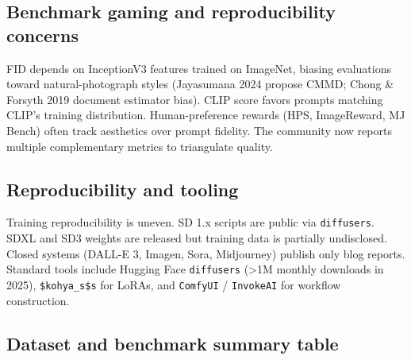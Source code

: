 \subsection{Benchmark gaming and reproducibility concerns}\label{benchmark-gaming-and-reproducibility-concerns}

FID depends on InceptionV3 features trained on ImageNet, biasing evaluations toward natural-photograph styles (Jayasumana 2024 propose CMMD; Chong \& Forsyth 2019 document estimator bias). CLIP score favors prompts matching CLIP's training distribution. Human-preference rewards (HPS, ImageReward, MJ Bench) often track aesthetics over prompt fidelity. The community now reports multiple complementary metrics to triangulate quality.

\subsection{Reproducibility and tooling}\label{reproducibility-and-tooling}

Training reproducibility is uneven. SD 1.x scripts are public via \texttt{diffusers}. SDXL and SD3 weights are released but training data is partially undisclosed. Closed systems (DALL-E 3, Imagen, Sora, Midjourney) publish only blog reports. Standard tools include Hugging Face \texttt{diffusers} (\textgreater1M monthly downloads in 2025), \texttt{\$kohya\_s\$s} for LoRAs, and \texttt{ComfyUI} / \texttt{InvokeAI} for workflow construction.

\subsection{Dataset and benchmark summary table}\label{dataset-and-benchmark-summary-table}


